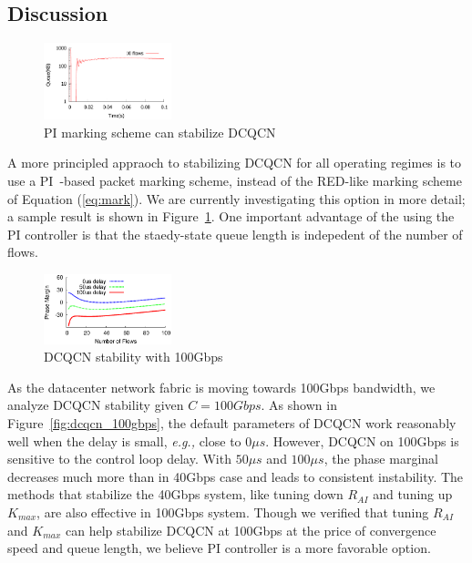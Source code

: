 \subsection{Discussion}

\begin{figure}
\center
\includegraphics[width=0.33\textwidth]{figures/stable_q_85_pi.pdf}
\caption{PI marking scheme can stabilize DCQCN}
\label{fig:dcqcn_pi}
\end{figure}

A more principled appraoch to stabilizing DCQCN for all operating regimes is to
use a PI~\cite{Hollot:PIController}-based packet marking scheme, instead of the
RED-like marking scheme of Equation (\ref{eq:mark}). We are currently
investigating this option in more detail; a sample result is shown in
Figure~\ref{fig:dcqcn_pi}. One important advantage of the using the PI
controller is that the staedy-state queue length is indepedent of the number of
flows.

\begin{figure}[t]
\center
\includegraphics[width=0.33\textwidth]{figures/dcqcn_stability_100gbps.eps}
\caption{DCQCN stability with 100Gbps}
\end{figure}

  As the datacenter network fabric is moving
towards 100Gbps bandwidth, we analyze DCQCN stability given $C=100Gbps$. As
shown in Figure~\ref{fig:dcqcn_100gbps}, the default parameters of DCQCN work
reasonably well when the delay is small, {\em e.g.,} close to $0\mu s$.
However, DCQCN on 100Gbps is sensitive to the control loop delay. With
$50\mu s$ and $100\mu s$, the phase marginal decreases much more than in 40Gbps
case and leads to consistent instability.  The methods that stabilize the 40Gbps
system, like tuning down $R_{AI}$ and tuning up $K_{max}$, are also effective in
100Gbps system. Though we verified that tuning $R_{AI}$ and $K_{max}$
can help stabilize DCQCN at 100Gbps at the price of convergence speed and queue length, 
we believe PI controller is a more favorable option.



